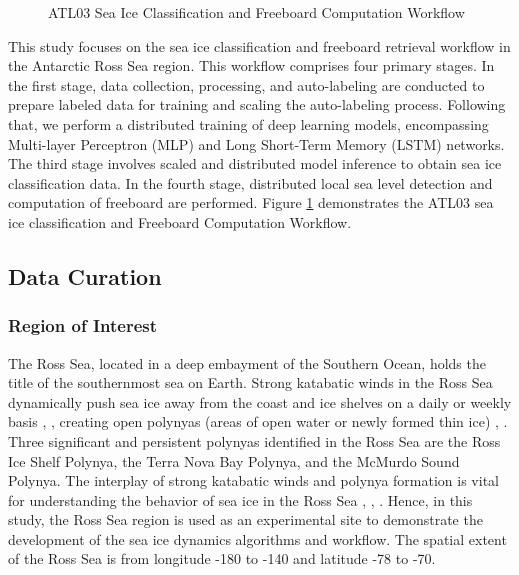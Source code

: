 \begin{figure}[!ht]
    \centering
\caption{ATL03 Sea Ice Classification and Freeboard Computation Workflow}
\label{fig:is2_workflow}
\end{figure}

This study focuses on the sea ice classification and freeboard retrieval workflow in the Antarctic Ross Sea region. This workflow comprises four primary stages. In the first stage, data collection, processing, and auto-labeling are conducted to prepare labeled data for training and scaling the auto-labeling process. Following that, we perform a distributed training of deep learning models, encompassing Multi-layer Perceptron (MLP) \cite{riedmiller2014multi} and Long Short-Term Memory (LSTM) \cite{hochreiter1997long} networks. The third stage involves scaled and distributed model inference to obtain sea ice classification data. In the fourth stage, distributed local sea level detection and computation of freeboard are performed. Figure \ref{fig:is2_workflow} demonstrates the ATL03 sea ice classification and Freeboard Computation Workflow.


\subsection{Data Curation}

\subsubsection{Region of Interest}
The Ross Sea, located in a deep embayment of the Southern Ocean, holds the title of the southernmost sea on Earth.%
Strong katabatic winds in the Ross Sea dynamically push sea ice away from the coast and ice shelves on a daily or weekly basis \cite{bromwich1993hemispheric}, \cite{dale2017atmospheric}, creating open polynyas (areas of open water or newly formed thin ice) \cite{bromwich1993hemispheric}, \cite{thompson2020frazil}. Three significant and persistent polynyas identified in the Ross Sea are the Ross Ice Shelf Polynya, the Terra Nova Bay Polynya, and the McMurdo Sound Polynya. The interplay of strong katabatic winds and polynya formation is vital for understanding the behavior of sea ice in the Ross Sea \cite{dai2020ice}, \cite{kwok2007ross}, \cite{tian2020sea}.
Hence, in this study, the Ross Sea region is used as an experimental site to demonstrate the development of the sea ice dynamics algorithms and workflow. 
The spatial extent of the Ross Sea is from longitude -180 to -140 and latitude -78 to -70.


